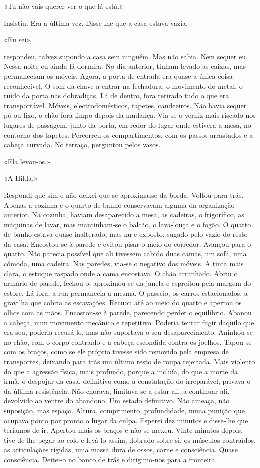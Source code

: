 «Tu não vais querer ver o que lá está.»

Insistiu. Era a última vez. Disse­‑lhe que a casa estava vazia.

«Eu sei»,

respondeu, talvez supondo a casa sem ninguém. Mas não sabia. Nem sequer
eu. Nessa noite eu ainda lá dormira. No dia anterior, tinham levado as
caixas, mas permaneciam os móveis. Agora, a porta de entrada era quase a
única coisa reconhecível. O som da chave a entrar na fechadura, o
movimento do metal, o ruído da porta nas dobradiças. Lá de dentro, fora
retirado tudo o que era transportável. Móveis, electrodomésticos,
tapetes, candeeiros. Não havia sequer pó ou lixo, o chão fora limpo
depois da mudança. Via­‑se o verniz mais riscado nos lugares de
passagem, junto da porta, em redor do lugar onde estivera a mesa, no
contorno dos tapetes. Percorreu os compartimentos, com os passos
arrastados e a cabeça curvada. No terraço, perguntou pelos vasos.

«Ela levou­‑os.»

«A Hilda.»

Respondi que sim e não deixei que se aproximasse da borda. Voltou para
trás. Apenas a cozinha e o quarto de banho conservavam alguma da
organização anterior. Na cozinha, haviam desaparecido a mesa, as
cadeiras, o frigorífico, as máquinas de lavar, mas mantinham­‑se o
balcão, o lava­‑louça e o fogão. O quarto de banho estava quase
inalterado, mas nu e exposto, sugado pelo vazio do resto da casa.
Encostou­‑se à parede e evitou pisar o meio do corredor. Avançou para o
quarto. Não parecia possível que ali tivessem cabido duas camas, um
sofá, uma cómoda, uma cadeira. Nas paredes, via­‑se o negativo dos
móveis. A tinta mais clara, o estuque raspado onde a cama encostava. O
chão arranhado. Abriu o armário de parede, fechou­‑o, aproximou­‑se da
janela e espreitou pela margem do estore. Lá fora, a rua permanecia a
mesma. O passeio, os carros estacionados, a gravilha que cobria as
escavações. Recuou até ao meio do quarto e apertou os olhos com as mãos.
Encostou­‑se à parede, parecendo perder o equilíbrio. Abanou a cabeça,
num movimento mecânico e repetitivo. Poderia tentar fugir daquilo que
era seu, poderia recusá­‑lo, mas não suportava o seu desaparecimento.
Aninhou­‑se no chão, com o corpo contraído e a cabeça escondida contra
os joelhos. Tapou­‑se com os braços, como se ele próprio tivesse sido
removido pela empresa de transportes, deixando para trás um último resto
de roupa rejeitada. Mais violento do que a agressão física, mais
profundo, porque a incluía, do que a morte da irmã, o despojar da casa,
definitivo como a constatação do irreparável, privava­‑o da última
resistência. Não chorava, limitava­‑se a estar ali, a continuar ali,
devolvido ao ventre do abandono. Um estado definitivo. Não ameaça, não
suposição, mas espaço. Altura, comprimento, profundidade, numa punição
que ocupava ponto por pronto o lugar da culpa. Esperei dez minutos e
disse­‑lhe que teríamos de ir. Apertou mais os braços e não se mexeu.
Vinte minutos depois, tive de lhe pegar ao colo e levá­‑lo assim,
dobrado sobre si, os músculos contraídos, as articulações rígidas, uma
massa dura de ossos, carne e consciência. Quase consciência. Deitei­‑o
no banco de trás e dirigimo­‑nos para a fronteira.

